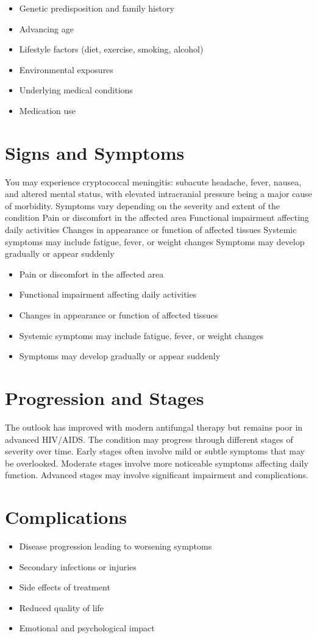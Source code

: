 \begin{itemize}[noitemsep]
  \item Genetic predisposition and family history
  \item Advancing age
  \item Lifestyle factors (diet, exercise, smoking, alcohol)
  \item Environmental exposures
  \item Underlying medical conditions
  \item Medication use
\end{itemize}
\section{Signs and Symptoms}
You may experience cryptococcal meningitis: subacute headache, fever, nausea, and altered mental status, with elevated intracranial pressure being a major cause of morbidity. Symptoms vary depending on the severity and extent of the condition Pain or discomfort in the affected area Functional impairment affecting daily activities Changes in appearance or function of affected tissues Systemic symptoms may include fatigue, fever, or weight changes Symptoms may develop gradually or appear suddenly

\begin{itemize}[noitemsep]
  \item Pain or discomfort in the affected area
  \item Functional impairment affecting daily activities
  \item Changes in appearance or function of affected tissues
  \item Systemic symptoms may include fatigue, fever, or weight changes
  \item Symptoms may develop gradually or appear suddenly
\end{itemize}
\section{Progression and Stages}
The outlook has improved with modern antifungal therapy but remains poor in advanced HIV/AIDS. The condition may progress through different stages of severity over time. Early stages often involve mild or subtle symptoms that may be overlooked. Moderate stages involve more noticeable symptoms affecting daily function. Advanced stages may involve significant impairment and complications.
\section{Complications}
\begin{itemize}[noitemsep]
  \item Disease progression leading to worsening symptoms
  \item Secondary infections or injuries
  \item Side effects of treatment
  \item Reduced quality of life
  \item Emotional and psychological impact
\end{itemize}
